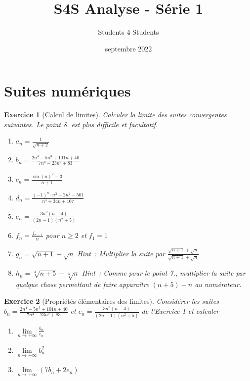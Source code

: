 \documentclass[11.5pt,french,table]{article}
\title{S4S Analyse - Série 1}
\author{Students 4 Students}
\date{septembre 2022}
\theoremstyle{exercice}
\newtheorem{exercice}{Exercice}
\begin{document}
\part{Suites numériques}
\begin{exercice}[Calcul de limites]
Calculer la limite des suites convergentes suivantes. Le point 8. est plus difficile et facultatif.

\begin{enumerate}
\item $\displaystyle a_n = \frac{1}{\sqrt{n + 2}}$
\item $\displaystyle b_n = \frac{2n^4 - 5n^3 + 101n + 40}{7n^4 - 23n^2 + 83}$
\item $\displaystyle c_n = \frac{\sin(n)^2 - 3}{n + 1}$
\item $\displaystyle d_n = \frac{(-1)^n \cdot n^3 + 2n^2 - 501}{n^4 + 34n + 107}$
\item $\displaystyle e_n = \frac{3n^2(n-4)}{(2n-1)(n^2+5)}$
\item $\displaystyle f_n = \frac{f_{n-1}}{n}$ pour $n \geq 2$ et $f_1 = 1$
\item $\displaystyle g_n = \sqrt{n + 1} - \sqrt{n}$ \newline
\emph{Hint~: Multiplier la suite par $\displaystyle \frac{\sqrt{n+1} + \sqrt{n}}{\sqrt{n+1} + \sqrt{n}}$}
\item[8.*] $\displaystyle h_n = \sqrt[3]{n+5} - \sqrt[3]{n}$ \newline
\emph{Hint~: Comme pour le point 7., multiplier la suite par quelque chose permettant de faire apparaître $(n+5) - n$ au numérateur.}
\end{enumerate}
\end{exercice}

\begin{exercice}[Propriétés élémentaires des limites]
Considérer les suites $\displaystyle b_n = \frac{2n^4 - 5n^3 + 101n + 40}{7n^4 - 23n^2 + 83}$ et $\displaystyle e_n = \frac{3n^2(n-4)}{(2n-1)(n^2+5)}$ de l'Exercice 1 et calculer
\begin{enumerate}
    \item $\displaystyle \lim \limits_{n \to +\infty} \frac{b_n}{e_n}$
    \item $\displaystyle \lim \limits_{n \to +\infty}  b_n^2$
    \item $\displaystyle \lim \limits_{n \to +\infty}  (7b_n + 2e_n)$
\end{enumerate}
\end{exercice}
\end{document}
